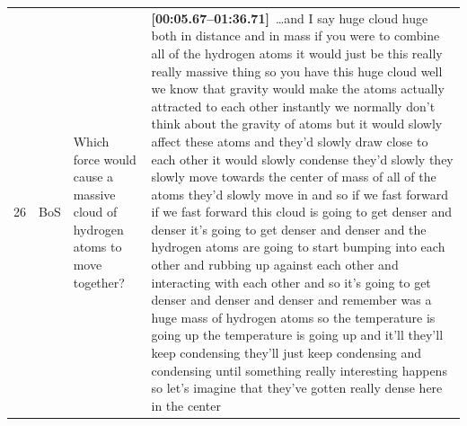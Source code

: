 \documentclass[10pt]{article}
\begin{document}
\begin{tiny}
\begin{longtable}{r p{0.3in} p{1.212in} p{3.8in}}
    26 &          BoS &                                                                                                                                                                                                      Which force would cause a massive cloud of hydrogen atoms to move together? &                                                                                                                                                                                                                                                                                                                                                                                                                                                                                                                                                                                                                                                                                                                                                                                                                                                                                                                                                                                                                                                                                                                                                                                                                                                                                                                                                                                                                                                                                                                                                                                                                                                                                                                                                                                                                                                                        \textbf{[00:05.67--01:36.71]}~\ldots and I say huge cloud huge both in distance and in mass if you were to combine all of the hydrogen atoms it would just be this really really massive thing so you have this huge cloud well we know that gravity would make the atoms actually attracted to each other instantly we normally don't think about the gravity of atoms but it would slowly affect these atoms and they'd slowly draw close to each other it would slowly condense they'd slowly they slowly move towards the center of mass of all of the atoms they'd slowly move in and so if we fast forward if we fast forward this cloud is going to get denser and denser it's going to get denser and denser and the hydrogen atoms are going to start bumping into each other and rubbing up against each other and interacting with each other and so it's going to get denser and denser and denser and remember was a huge mass of hydrogen atoms so the temperature is going up the temperature is going up and it'll they'll keep condensing they'll just keep condensing and condensing until something really interesting happens so let's imagine that they've gotten really dense here in the center 
\end{longtable}
\end{tiny}
\end{document}
